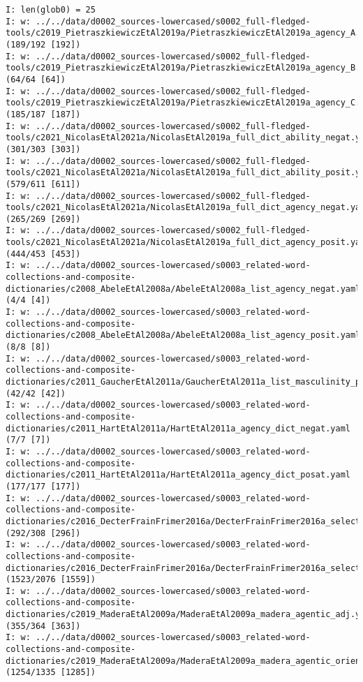 \documentclass[a4paper,10pt,onecolumn,oneside,openright]{article}
\begin{document}
\begin{verbatim}
I: len(glob0) = 25
I: w: ../../data/d0002_sources-lowercased/s0002_full-fledged-tools/c2019_PietraszkiewiczEtAl2019a/PietraszkiewiczEtAl2019a_agency_A.yaml (189/192 [192])
I: w: ../../data/d0002_sources-lowercased/s0002_full-fledged-tools/c2019_PietraszkiewiczEtAl2019a/PietraszkiewiczEtAl2019a_agency_B.yaml (64/64 [64])
I: w: ../../data/d0002_sources-lowercased/s0002_full-fledged-tools/c2019_PietraszkiewiczEtAl2019a/PietraszkiewiczEtAl2019a_agency_C.yaml (185/187 [187])
I: w: ../../data/d0002_sources-lowercased/s0002_full-fledged-tools/c2021_NicolasEtAl2021a/NicolasEtAl2019a_full_dict_ability_negat.yaml (301/303 [303])
I: w: ../../data/d0002_sources-lowercased/s0002_full-fledged-tools/c2021_NicolasEtAl2021a/NicolasEtAl2019a_full_dict_ability_posit.yaml (579/611 [611])
I: w: ../../data/d0002_sources-lowercased/s0002_full-fledged-tools/c2021_NicolasEtAl2021a/NicolasEtAl2019a_full_dict_agency_negat.yaml (265/269 [269])
I: w: ../../data/d0002_sources-lowercased/s0002_full-fledged-tools/c2021_NicolasEtAl2021a/NicolasEtAl2019a_full_dict_agency_posit.yaml (444/453 [453])
I: w: ../../data/d0002_sources-lowercased/s0003_related-word-collections-and-composite-dictionaries/c2008_AbeleEtAl2008a/AbeleEtAl2008a_list_agency_negat.yaml (4/4 [4])
I: w: ../../data/d0002_sources-lowercased/s0003_related-word-collections-and-composite-dictionaries/c2008_AbeleEtAl2008a/AbeleEtAl2008a_list_agency_posit.yaml (8/8 [8])
I: w: ../../data/d0002_sources-lowercased/s0003_related-word-collections-and-composite-dictionaries/c2011_GaucherEtAl2011a/GaucherEtAl2011a_list_masculinity_pertaining.yaml (42/42 [42])
I: w: ../../data/d0002_sources-lowercased/s0003_related-word-collections-and-composite-dictionaries/c2011_HartEtAl2011a/HartEtAl2011a_agency_dict_negat.yaml (7/7 [7])
I: w: ../../data/d0002_sources-lowercased/s0003_related-word-collections-and-composite-dictionaries/c2011_HartEtAl2011a/HartEtAl2011a_agency_dict_posat.yaml (177/177 [177])
I: w: ../../data/d0002_sources-lowercased/s0003_related-word-collections-and-composite-dictionaries/c2016_DecterFrainFrimer2016a/DecterFrainFrimer2016a_selected_liwc_cats_agency_negat.yaml (292/308 [296])
I: w: ../../data/d0002_sources-lowercased/s0003_related-word-collections-and-composite-dictionaries/c2016_DecterFrainFrimer2016a/DecterFrainFrimer2016a_selected_liwc_cats_agency_posit.yaml (1523/2076 [1559])
I: w: ../../data/d0002_sources-lowercased/s0003_related-word-collections-and-composite-dictionaries/c2019_MaderaEtAl2009a/MaderaEtAl2009a_madera_agentic_adj.yaml (355/364 [363])
I: w: ../../data/d0002_sources-lowercased/s0003_related-word-collections-and-composite-dictionaries/c2019_MaderaEtAl2009a/MaderaEtAl2009a_madera_agentic_orient_liwc.yaml (1254/1335 [1285])

\end{verbatim}
\end{document}
